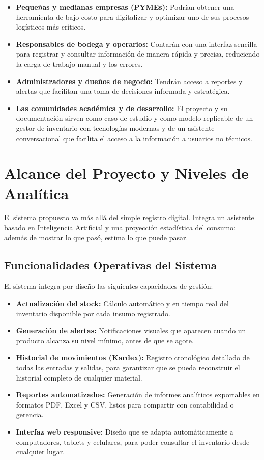 \begin{itemize}
    \item \textbf{Pequeñas y medianas empresas (PYMEs):} Podrían obtener una herramienta de bajo costo para digitalizar y optimizar uno de sus procesos logísticos más críticos.
    \item \textbf{Responsables de bodega y operarios:} Contarán con una interfaz sencilla para registrar y consultar información de manera rápida y precisa, reduciendo la carga de trabajo manual y los errores.
    \item \textbf{Administradores y dueños de negocio:} Tendrán acceso a reportes y alertas que facilitan una toma de decisiones informada y estratégica.
    \item \textbf{Las comunidades académica y de desarrollo:} El proyecto y su documentación sirven como caso de estudio y como modelo replicable de un gestor de inventario con tecnologías modernas y de un asistente conversacional que facilita el acceso a la información a usuarios no técnicos.
\end{itemize}


\section{Alcance del Proyecto y Niveles de Analítica}

El sistema propuesto va más allá del simple registro digital. Integra un asistente basado en Inteligencia Artificial y una proyección estadística del consumo: además de mostrar lo que pasó, estima lo que puede pasar.

\subsection{Funcionalidades Operativas del Sistema}
El sistema integra por diseño las siguientes capacidades de gestión:
\begin{itemize}
    \item \textbf{Actualización del stock:} Cálculo automático y en tiempo real del inventario disponible por cada insumo registrado.
    \item \textbf{Generación de alertas:} Notificaciones visuales que aparecen cuando un producto alcanza su nivel mínimo, antes de que se agote.
    \item \textbf{Historial de movimientos (Kardex):} Registro cronológico detallado de todas las entradas y salidas, para garantizar que se pueda reconstruir el historial completo de cualquier material.
    \item \textbf{Reportes automatizados:} Generación de informes analíticos exportables en formatos PDF, Excel y CSV, listos para compartir con contabilidad o gerencia.
    \item \textbf{Interfaz web responsive:} Diseño que se adapta automáticamente a computadores, tablets y celulares, para poder consultar el inventario desde cualquier lugar.
\end{itemize}

